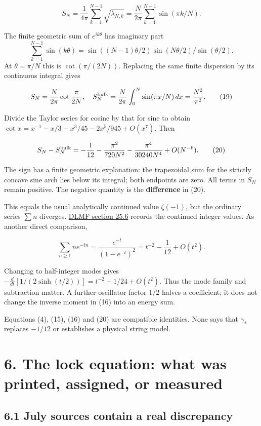 \documentclass[11pt,a4paper]{article}
\begin{document}
\[
S_N=\frac1{4\pi}\sum_{k=1}^{N-1}\sqrt{\lambda_{N,k}}
=\frac N{2\pi}\sum_{k=1}^{N-1}\sin(\pi k/N). \tag{18}
\]

The finite geometric sum of $e^{ik\theta}$ has imaginary part
\[\sum_{k=1}^{N-1}\sin(k\theta)
=\sin((N-1)\theta/2)\sin(N\theta/2)/\sin(\theta/2).\]
At $\theta=\pi/N$ this is $\cot(\pi/(2N))$. Replacing the same finite dispersion by its continuous integral gives


\[
S_N=\frac N{2\pi}\cot\frac{\pi}{2N},\quad
S_N^{\rm bulk}=\frac N{2\pi}\int_0^N\sin(\pi x/N)\,dx
=\frac{N^2}{\pi^2}. \tag{19}
\]

Divide the Taylor series for cosine by that for sine to obtain
$\cot x=x^{-1}-x/3-x^3/45-2x^5/945+O(x^7)$.
Then


\[
S_N-S_N^{\rm bulk}
=-\frac1{12}-\frac{\pi^2}{720N^2}
-\frac{\pi^4}{30240N^4}+O(N^{-6}). \tag{20}
\]

The sign has a finite geometric explanation: the trapezoidal sum for the strictly concave sine arch lies below its integral; both endpoints are zero. All terms in $S_N$ remain positive. The negative quantity is the \textbf{difference} in (20).


This equals the usual analytically continued value $\zeta(-1)$, but the ordinary series $\sum n$ diverges. \href{https://dlmf.nist.gov/25.6}{DLMF section 25.6} records the continued integer values. As another direct comparison,


\[
\sum_{n\geq1}ne^{-tn}
=\frac{e^{-t}}{(1-e^{-t})^2}
=t^{-2}-\frac1{12}+O(t^2). \tag{21}
\]

Changing to half-integer modes gives
$-\frac d{dt}[1/(2\sinh(t/2))]=t^{-2}+1/24+O(t^2)$.
Thus the mode family and subtraction matter. A further oscillator factor $1/2$ halves a coefficient; it does not change the inverse moment in (16) into an energy sum.


Equations (4), (15), (16) and (20) are compatible identities. None says that $\gamma_*$ replaces $-1/12$ or establishes a physical string model.


\clearpage
\section*{6. The lock equation: what was printed, assigned, or measured}

\subsection*{6.1 July sources contain a real discrepancy}
\end{document}
